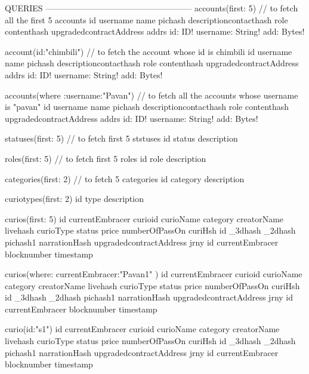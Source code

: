 QUERIES
-----------------------------------------------------
accounts(first: 5){     // to fetch all the first 5 accounts
    id
    username
    name
    pichash
    descriptioncontacthash
    role
	contenthash
    upgradedcontractAddress
	addrs {
	 id: ID!
     username: String!
     add: Bytes!
	}
  }
  
account(id:"chimbili"){      // to fetch the account whose id is chimbili
    id
    username
    name
    pichash
    descriptioncontacthash
    role
    contenthash
    upgradedcontractAddress
	addrs {
	 id: ID!
     username: String!
     add: Bytes!
	}
  }
  
accounts(where :{username:"Pavan"}){     //  to fetch all the accounts whose username is "pavan"
    id
    username
    name
    pichash
    descriptioncontacthash
    role
    contenthash
    upgradedcontractAddress
	addrs {
	 id: ID!
     username: String!
     add: Bytes!
	}
  }	
  
  
  
  statuses(first: 5) {    // to fetch first 5 ststuses
    id
    status
    description
  }
  
  roles(first: 5) {   // to fetch first 5 roles
    id
    role
    description
  }
  
  categories(first: 2){  // to fetch 5 categories
    id
    category
    description
  }
  
  curiotypes(first: 2){  
    id
    type
    description
  }
  
  curios(first: 5){   
    id
  	currentEmbracer
  	curioid
  	curioName
  	category
  	creatorName
  	livehash
  	curioType
  	status
  	price
  	numberOfPassOn
  	curiHsh {
  	  id
	  _3dhash
	  _2dhash
	  pichash1
	  narrationHash
  	}
  	upgradedcontractAddress
  	jrny{
      id
	  currentEmbracer
	  blocknumber
	  timestamp
    }
  }
  
  curios(where: {currentEmbracer:"Pavan1"} ){   
    id
  	currentEmbracer
  	curioid
  	curioName
  	category
  	creatorName
  	livehash
  	curioType
  	status
  	price
  	numberOfPassOn
  	curiHsh {
  	  id
	  _3dhash
	  _2dhash
	  pichash1
	  narrationHash
  	}
  	upgradedcontractAddress
  	jrny{
      id
	  currentEmbracer
	  blocknumber
	  timestamp
    }
  }
  
  
  curio(id:"s1"){     
    id
  	currentEmbracer
  	curioid
  	curioName
  	category
  	creatorName
  	livehash
  	curioType
  	status
  	price
  	numberOfPassOn
  	curiHsh {
  	  id
	  _3dhash
	  _2dhash
	  pichash1
	  narrationHash
  	}
  	upgradedcontractAddress
  	jrny{
      id
	  currentEmbracer
	  blocknumber
	  timestamp
    }
  }
  
